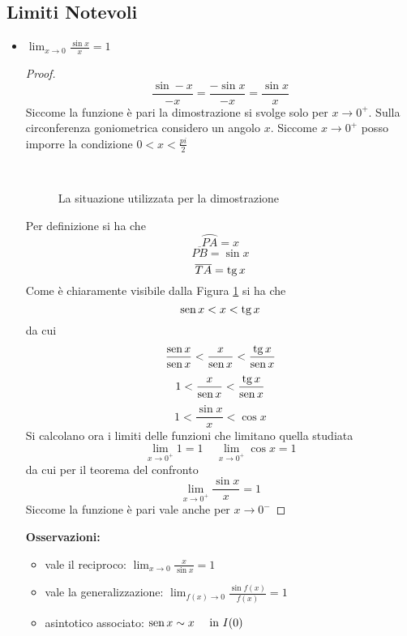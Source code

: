 \subsection{Limiti Notevoli}
\begin{itemize}
\item {$\lim_{x\to 0}\frac{\sin x}{x}=1$}
\begin{proof}
    \[\frac{\sin -x}{-x}=\frac{-\sin x}{-x}=\frac{\sin x}{x}\]
    Siccome la funzione è pari la dimostrazione si svolge solo per $x\to 0^+$. Sulla circonferenza goniometrica considero un angolo $x$. Siccome $x \to 0^+$ posso imporre la condizione $0<x<\frac{pi}{2}$\\
    \begin{figure}[h]
        \centering
            \\
        \caption{La situazione utilizzata per la dimostrazione}
        \label{fig:sinx}
    \end{figure}
    Per definizione si ha che \[\wideparen{PA}=x\]\[\overline{PB}=\sin x\] \[\overline{TA}=\tg x\] 
    Come è chiaramente visibile dalla Figura \ref{fig:sinx} si ha che \[\sin x < x < \tg x\] da cui \[\frac{\sin x}{\sin x}<\frac{ x}{\sin x}<\frac{\tg x}{\sin x}\] \[1<\frac{ x}{\sin x}<\frac{\tg x}{\sin x}\] \[1<\frac{\sin x}{x}<\cos x\]
    Si calcolano ora i limiti delle funzioni che limitano quella studiata
    \[\lim_{x \to 0^+}1=1 ~~~~~ \lim_{x \to 0^+}\cos x=1\]
    da cui per il teorema del confronto \[\lim_{x\to 0^+} \frac{\sin x}{x}=1\] Siccome la funzione è pari vale anche per $x\to0^-$
\end{proof}
\textbf{Osservazioni:}
\begin{itemize}
    \item vale il reciproco: $\lim_{x\to 0}\frac{x}{\sin x}=1$
    \item vale la generalizzazione: $\lim_{f(x)\to 0}\frac{\sin f(x)}{f(x)}=1$
    \item asintotico associato: $\sin x \sim x ~~~~\textnormal{in } I(0)$

\end{itemize}
\end{itemize}
